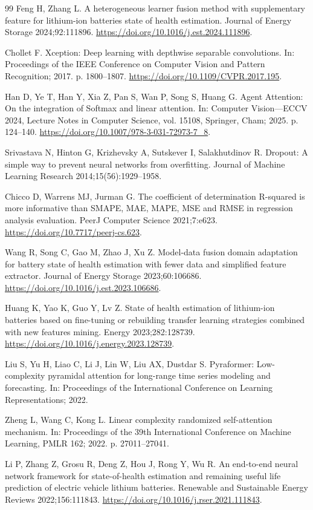 \begin{thebibliography}{99}
 Feng H, Zhang L. A heterogeneous learner fusion method with supplementary feature for lithium-ion batteries state of health estimation. Journal of Energy Storage 2024;92:111896. \url{https://doi.org/10.1016/j.est.2024.111896}.

 Chollet F. Xception: Deep learning with depthwise separable convolutions. In: Proceedings of the IEEE Conference on Computer Vision and Pattern Recognition; 2017. p. 1800–1807. \url{https://doi.org/10.1109/CVPR.2017.195}.

 Han D, Ye T, Han Y, Xia Z, Pan S, Wan P, Song S, Huang G. Agent Attention: On the integration of Softmax and linear attention. In: Computer Vision—ECCV 2024, Lecture Notes in Computer Science, vol. 15108, Springer, Cham; 2025. p. 124–140. \url{https://doi.org/10.1007/978-3-031-72973-7\_8}.

 Srivastava N, Hinton G, Krizhevsky A, Sutskever I, Salakhutdinov R. Dropout: A simple way to prevent neural networks from overfitting. Journal of Machine Learning Research 2014;15(56):1929–1958.

 Chicco D, Warrens MJ, Jurman G. The coefficient of determination R-squared is more informative than SMAPE, MAE, MAPE, MSE and RMSE in regression analysis evaluation. PeerJ Computer Science 2021;7:e623. \url{https://doi.org/10.7717/peerj-cs.623}.

 Wang R, Song C, Gao M, Zhao J, Xu Z. Model-data fusion domain adaptation for battery state of health estimation with fewer data and simplified feature extractor. Journal of Energy Storage 2023;60:106686. \url{https://doi.org/10.1016/j.est.2023.106686}.

 Huang K, Yao K, Guo Y, Lv Z. State of health estimation of lithium-ion batteries based on fine-tuning or rebuilding transfer learning strategies combined with new features mining. Energy 2023;282:128739. \url{https://doi.org/10.1016/j.energy.2023.128739}.

 Liu S, Yu H, Liao C, Li J, Lin W, Liu AX, Dustdar S. Pyraformer: Low-complexity pyramidal attention for long-range time series modeling and forecasting. In: Proceedings of the International Conference on Learning Representations; 2022.

 Zheng L, Wang C, Kong L. Linear complexity randomized self-attention mechanism. In: Proceedings of the 39th International Conference on Machine Learning, PMLR 162; 2022. p. 27011–27041.

 Li P, Zhang Z, Grosu R, Deng Z, Hou J, Rong Y, Wu R. An end-to-end neural network framework for state-of-health estimation and remaining useful life prediction of electric vehicle lithium batteries. Renewable and Sustainable Energy Reviews 2022;156:111843. \url{https://doi.org/10.1016/j.rser.2021.111843}.

\end{thebibliography}

\endgroup
